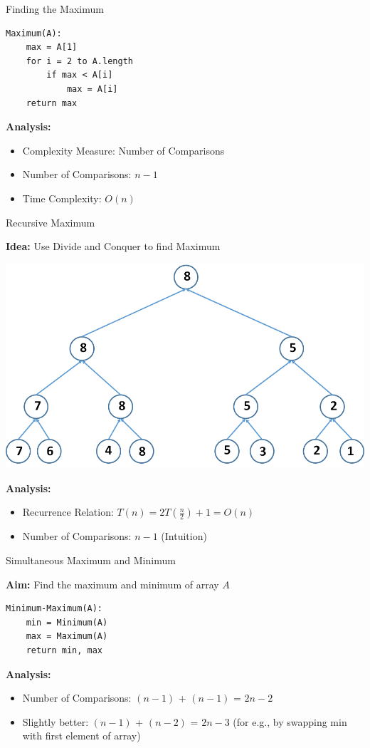 \documentclass{beamer}
\begin{document}
\begin{frame}[fragile]{Finding the Maximum}
\begin{verbatim}
Maximum(A):
    max = A[1]
    for i = 2 to A.length
        if max < A[i]
            max = A[i]
    return max 
\end{verbatim}
{\bf Analysis:}
\begin{itemize}
\item Complexity Measure: Number of Comparisons
\item Number of Comparisons: $n-1$
\item Time Complexity: $O(n)$
\end{itemize}
\end{frame}


\begin{frame}{Recursive Maximum}

{\bf Idea:} Use Divide and Conquer to find Maximum
\pause
\begin{center}
    \includegraphics[scale=0.3]{recursiveMaximum.png}
\end{center}

{\bf Analysis:}
\pause
\begin{itemize}
    \item Recurrence Relation: $T(n) = 2T(\frac{n}{2}) + 1 = O(n)$
    \item Number of Comparisons: $n-1$ (Intuition)
\end{itemize}
\end{frame}


\begin{frame}[fragile]{Simultaneous Maximum and Minimum}

{\bf Aim:} Find the maximum and minimum of array $A$ 
\pause
\begin{verbatim}
Minimum-Maximum(A):
    min = Minimum(A)
    max = Maximum(A)
    return min, max
\end{verbatim}
{\bf Analysis:}
\pause
\begin{itemize}
    \item Number of Comparisons: $(n-1)$ + $(n-1)$ = $2n-2$
    \pause
    \item Slightly better: $(n-1)$ + $(n-2)$ = $2n-3$ (for e.g., by swapping min with first element of array)
\end{itemize}
\end{frame}
\end{document}
